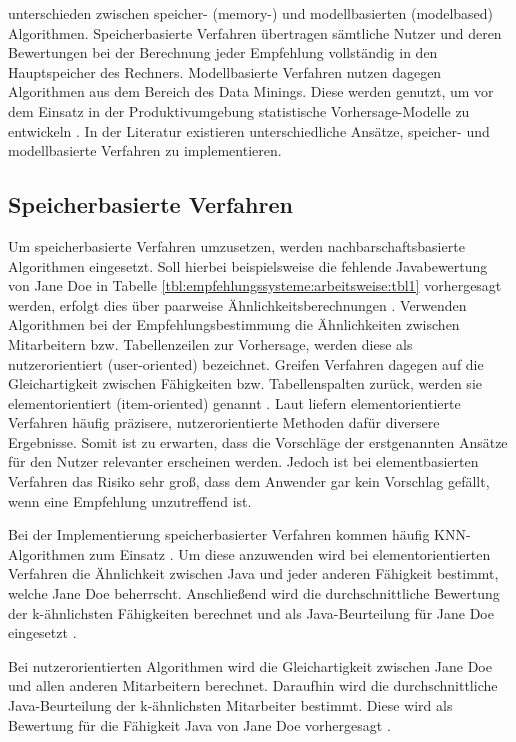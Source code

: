 \textcite[S. 3]{breese:1998} unterschieden zwischen speicher- (memory-) und modellbasierten (modelbased) Algorithmen. Speicherbasierte Verfahren übertragen sämtliche Nutzer und deren Bewertungen bei der Berechnung jeder Empfehlung vollständig in den Hauptspeicher des Rechners. Modellbasierte Verfahren nutzen dagegen Algorithmen aus dem Bereich des Data Minings. Diese werden genutzt, um vor dem Einsatz in der Produktivumgebung statistische Vorhersage-Modelle zu entwickeln \cite[S. 3]{breese:1998}\cite[S. 11]{schafer:2007}. In der Literatur existieren unterschiedliche Ansätze, speicher- und modellbasierte Verfahren zu implementieren.

\subsection{Speicherbasierte Verfahren}
\label{ch:empfehlungssysteme:cf:speicherbasiert}
Um speicherbasierte Verfahren umzusetzen, werden nachbarschaftsbasierte Algorithmen eingesetzt. Soll hierbei beispielsweise die fehlende Javabewertung von Jane Doe in Tabelle \ref{tbl:empfehlungssysteme:arbeitsweise:tbl1} vorhergesagt werden, erfolgt dies über paarweise Ähnlichkeitsberechnungen \cite[S. 2f.]{bharti:2019}. Verwenden Algorithmen bei der Empfehlungsbestimmung die Ähnlichkeiten zwischen Mitarbeitern bzw. Tabellenzeilen zur Vorhersage, werden diese als nutzerorientiert (user-oriented) bezeichnet. Greifen Verfahren dagegen auf die Gleichartigkeit zwischen Fähigkeiten bzw. Tabellenspalten zurück, werden sie elementorientiert (item-oriented) genannt \cite[S. 1f.]{duong:2018}. Laut \textcite[S. 42]{recommenderSystems:2016} liefern elementorientierte Verfahren häufig präzisere, nutzerorientierte Methoden dafür diversere Ergebnisse. Somit ist zu erwarten, dass die Vorschläge der erstgenannten Ansätze für den Nutzer relevanter erscheinen werden. Jedoch ist bei elementbasierten Verfahren das Risiko sehr groß, dass dem Anwender gar kein Vorschlag gefällt, wenn eine Empfehlung unzutreffend ist.

Bei der Implementierung speicherbasierter Verfahren kommen häufig \ac{KNN}-Algorithmen zum Einsatz \cite[S. 1]{nayak:2018}. Um diese anzuwenden wird bei elementorientierten Verfahren die Ähnlichkeit zwischen Java und jeder anderen Fähigkeit bestimmt, welche Jane Doe beherrscht. Anschließend wird die durchschnittliche Bewertung der k-ähnlichsten Fähigkeiten berechnet und als Java-Beurteilung für Jane Doe eingesetzt \cite[S. 2]{hao:2013}.

Bei nutzerorientierten Algorithmen wird die Gleichartigkeit zwischen Jane Doe und allen anderen Mitarbeitern berechnet. Daraufhin wird die durchschnittliche Java-Beurteilung der k-ähnlichsten Mitarbeiter bestimmt. Diese wird als Bewertung für die Fähigkeit Java von Jane Doe vorhergesagt \cite[S. 2f.]{hao:2013}.

